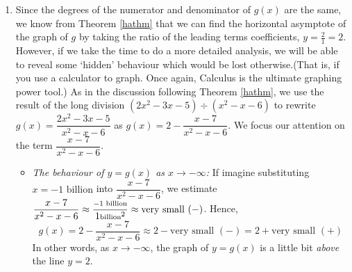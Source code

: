 {\begin{enumerate}
\begin{itemize}
\end{itemize}

Our results are given graphically (again, without labels on the $y$-axis) in Figure \ref{fig:ratgraph5}.




\item  Since the degrees of the numerator and denominator of $g(x)$ are the same, we know from Theorem \ref{hathm} that we can find the horizontal asymptote of the graph of $g$ by taking the ratio of the leading terms coefficients, $y = \frac{2}{1} = 2$.  However, if we take the time to do a more detailed analysis, we will be able to reveal some `hidden' behaviour which would be lost otherwise.(That is, if you use a calculator to graph. Once again, Calculus is the ultimate graphing power tool.)  As in the discussion following Theorem \ref{hathm}, we use the result of the long division $\left(2x^2-3x-5\right) \div \left(x^2-x-6\right)$ to rewrite $g(x) = \dfrac{2x^2-3x-5}{x^2-x-6}$ as $g(x) = 2 - \dfrac{x-7}{x^2-x-6}.$  We focus our attention on the term $\dfrac{x-7}{x^2-x-6}$.  

\drawexampleline

\begin{itemize}

\item  \textit{The behaviour of $y=g(x)$ as $x \rightarrow -\infty$:} If imagine substituting $x = \mbox{$-1$ billion}$ into $\dfrac{x-7}{x^2-x-6}$, we estimate $\dfrac{x-7}{x^2-x-6} \approx \dfrac{\mbox{\scriptsize $-1$ billion}}{1 \mbox{\scriptsize billion}^2} \approx \mbox{very small $(-)$}$.  Hence, \[g(x) =  2 - \dfrac{x-7}{x^2-x-6} \approx 2 - \mbox{very small $(-)$} = 2 + \mbox{very small $(+)$}\]  In other words, as $x \rightarrow -\infty$, the graph of $y=g(x)$ is a little bit \textit{above} the line $y=2$.



\end{itemize}
\end{enumerate}}
